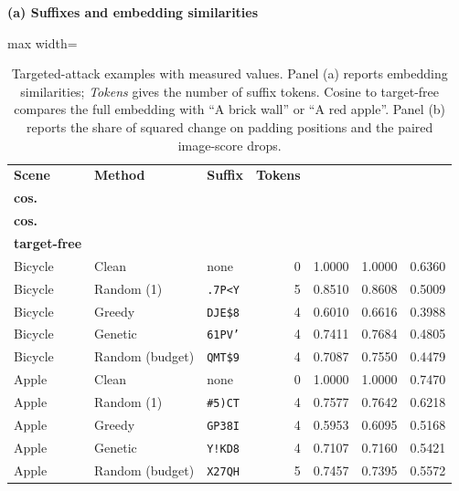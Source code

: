 \documentclass[11pt]{article}
\begin{document}
\begin{table}[!h]
\centering
\small
\setlength{\tabcolsep}{4pt}
\caption{Targeted-attack examples with measured values. Panel (a) reports embedding similarities; \emph{Tokens} gives the number of suffix tokens. Cosine to target-free compares the full embedding with ``A brick wall'' or ``A red apple''. Panel (b) reports the share of squared change on padding positions and the paired image-score drops.}
\label{tab:targeted}
\textbf{(a) Suffixes and embedding similarities}\par\smallskip
\begin{adjustbox}{max width=\linewidth}
\begin{tabular}{@{}lllrrrr@{}}
\toprule
\textbf{Scene} & \textbf{Method} & \textbf{Suffix} & \textbf{Tokens} & \shortstack{\textbf{Masked}\\\textbf{cos.}} & \shortstack{\textbf{Full}\\\textbf{cos.}} & \shortstack{\textbf{Cos. to}\\\textbf{target-free}} \\
\midrule
Bicycle & Clean & none & 0 & 1.0000 & 1.0000 & 0.6360 \\
Bicycle & Random (1) & \texttt{.7P\textless{}Y} & 5 & 0.8510 & 0.8608 & 0.5009 \\
Bicycle & Greedy & \texttt{DJE\$8} & 4 & 0.6010 & 0.6616 & 0.3988 \\
Bicycle & Genetic & \texttt{61PV'} & 4 & 0.7411 & 0.7684 & 0.4805 \\
Bicycle & Random (budget) & \texttt{QMT\$9} & 4 & 0.7087 & 0.7550 & 0.4479 \\
\addlinespace
Apple & Clean & none & 0 & 1.0000 & 1.0000 & 0.7470 \\
Apple & Random (1) & \texttt{\#5)CT} & 4 & 0.7577 & 0.7642 & 0.6218 \\
Apple & Greedy & \texttt{GP38I} & 4 & 0.5953 & 0.6095 & 0.5168 \\
Apple & Genetic & \texttt{Y!KD8} & 4 & 0.7107 & 0.7160 & 0.5421 \\
Apple & Random (budget) & \texttt{X27QH} & 5 & 0.7457 & 0.7395 & 0.5572 \\
\bottomrule
\end{tabular}
\end{adjustbox}


\end{table}
\end{document}
